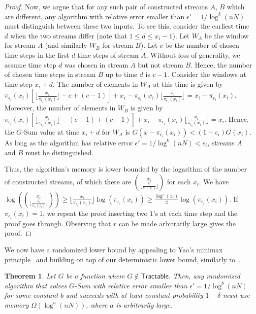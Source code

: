 \documentclass[11pt]{article}
\newtheorem{thm}{Theorem}
\begin{document}
\begin{proof}
Now, we argue that for any such pair of constructed streams $A$, $B$ which are different, any algorithm
with relative error smaller than $\epsilon' = 1/\log^k(nN)$ must distinguish between these two inputs.
To see this, consider the earliest time $d$ when the two streams differ (note that $1 \leq d \leq x_i - 1$).
Let $W_A$ be the window for stream $A$ (and similarly $W_B$ for stream $B$).
Let $c$ be the number of chosen time steps in the first $d$ time steps of stream $A$.
Without loss of generality, we assume time step $d$ was chosen in stream $A$
but not stream $B$.  Hence, the number of chosen time steps in stream $B$ up to time
$d$ is $c-1$.  Consider the windows at time step $x_i + d$.  The number of elements in $W_A$ at this time
is given by $\pi_{\epsilon_i}(x_i)[\lfloor\frac{x_i}{\pi_{\epsilon_i}(x_i)}\rfloor - c + (c-1)] + x_i -
\pi_{\epsilon_i}(x_i)\lfloor\frac{x_i}{\pi_{\epsilon_i}(x_i)}\rfloor = x_i - \pi_{\epsilon_i}(x_i)$.  Moreover,
the number of elements in $W_B$ is given by
$\pi_{\epsilon_i}(x_i)[\lfloor\frac{x_i}{\pi_{\epsilon_i}(x_i)}\rfloor - (c-1) + (c-1)] + x_i -
\pi_{\epsilon_i}(x_i)\lfloor\frac{x_i}{\pi_{\epsilon_i}(x_i)}\rfloor = x_i$.
Hence, the $G$-Sum value at time $x_i + d$ for $W_A$ is $G(x - \pi_{\epsilon_i}(x_i)) < (1-\epsilon_i)G(x_i)$.
As long as the algorithm has relative error $\epsilon ' = 1/\log^k(nN) < \epsilon_i$, streams $A$ and
$B$ must be distinguished.

Thus, the algorithm's memory is lower bounded by the logarithm of the number of constructed streams, of which
there are $\binom{x_i}{\lfloor\frac{x_i}{\pi_{\epsilon_i}(x_i)}\rfloor}$ for each $x_i$.  We have
$\log(\binom{x_i}{\lfloor\frac{x_i}{\pi_{\epsilon_i}(x_i)}\rfloor}) \geq
\lfloor\frac{x_i}{\pi_{\epsilon_i}(x_i)}\rfloor \log (\pi_{\epsilon_i}(x_i)) \geq
\frac{\log^r(x_i)}{2}\log(\pi_{\epsilon_i}(x_i)).$
If $\pi_{\epsilon_i}(x_i) = 1$, we repeat the proof inserting two $1$'s at each time step and the proof goes through.
Observing that $r$ can be made arbitrarily large gives the proof.
\end{proof}

We now have a randomized lower bound by appealing to Yao's minimax principle~\cite{MR95} and building on top of our
deterministic lower bound, similarly to~\cite{DGIM02}.
\begin{thm}\label{thm:rlb}
Let $G$ be a function where $G \not\in \mathsf{Tractable}$.  Then, any randomized algorithm that solves
$G$-Sum with relative error smaller than $\epsilon' = 1/\log^b(nN)$ for some constant $b$ and
succeeds with at least constant probability $1 - \delta$ must use memory $\Omega(\log^a(nN))$, where $a$
is arbitrarily large.
\end{thm}
\end{document}
